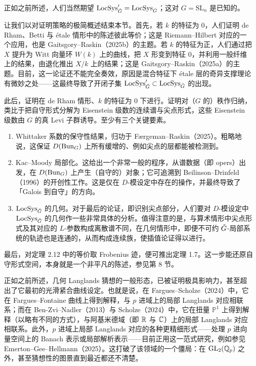 正如之前所述，人们当然期望 $\operatorname{LocSys}'_{\check{G}} = \operatorname{LocSys}_{\check{G}}$；这对 $G = \mathrm{SL}_n$ 是已知的。

让我们以对证明策略的极简概述结束本节。首先，若 $k$ 的特征为 $0$，人们证明 de Rham、Betti 与 étale 情形中的陈述彼此等价；这是 Riemann–Hilbert 对应的一个应用，也是 Gaitsgory–Raskin（2025b）的主题。若 $k$ 的特征为正，人们通过把 $X$ 提升为 Witt 向量环 $W(k)$ 上的曲线，把 $X$ 形变到特征 $0$，并利用一般纤维上的结果，由退化推出 $X/k$ 上的结果；这是 Gaitsgory–Raskin（2025a）的主题。目前，这一论证还不能完全奏效，原因是混合特征下 étale 层的奇异支撑理论有微妙之处——这最终导致了开闭子集 $\operatorname{LocSys}'_{\check{G}} \subset \operatorname{LocSys}_{\check{G}}$ 的出现。

此后，证明在 de Rham 情形、$k$ 的特征为 $0$ 下进行。证明对（$G$ 的）秩作归纳，类比于把自守形式分解为 Eisenstein 级数的连续谱与尖点形式，这些 Eisenstein 级数由 $G$ 的真 Levi 子群诱导。至少有三个关键要素。

\begin{enumerate}
\item Whittaker 系数的保守性结果，归功于 Færgeman–Raskin（2025）。粗略地说，这保证 $D(\operatorname{Bun}_G)$ 上所有缓增的、例如尖点的层都能被检测到。
\item Kac–Moody 局部化。这给出一个非常一般的程序，从谱数据（即 opers）出发，在 $D(\operatorname{Bun}_G)$ 上产生（自守的）对象；它可追溯到 Beilinson–Drinfeld（1996）的开创性工作。这是仅在 $D$-模设定中存在的操作，并最终导致了「Galois 到自守」的方向。
\item $\operatorname{LocSys}_{\check{G}}$ 的几何。对于最后的论证，即识别尖点部分，人们要对 $D$-模设定中 $\operatorname{LocSys}_{\check{G}}$ 的几何作一些非常具体的分析。值得注意的是，与算术情形中尖点形式及其对应的 $L$-参数构成离散谱不同，在几何情形中，即便不可约 $\check{G}$-局部系统的轨迹也是连通的，从而构成连续族，使插值论证得以进行。
\end{enumerate}

最后，对定理 2.12 中的等价取 Frobenius 迹，便可推出定理 1.7。这一步能还原自守形式空间，本身就是一个非平凡的陈述，参见第 8 节。

\begin{remark}
正如之前所述，几何 Langlands 猜想的一般形态，已被证明极具影响力，甚至超出了它最初的光滑紧合曲线设定。也就是说，在 Fargues–Scholze（2024）中，它在 Fargues–Fontaine 曲线上得到解释，与 $p$ 进域上的局部 Langlands 对应相联系；而在 Ben-Zvi–Nadler（2013）与 Scholze（2024）中，它在扭量 $\mathbb{P}^1$ 上得到解释（以略有不同的方式），与阿基米德域（即 $\mathbb{R}$ 与 $\mathbb{C}$）上的局部 Langlands 对应相联系。此外，$p$ 进域上局部 Langlands 对应的各种更精细形式——处理 $p$ 进向量空间上的 Banach 表示或局部解析表示——目前正用这一范式研究，例如参见 Emerton–Gee–Hellmann（2025）。这打破了该领域的一个僵局：在 $\mathrm{GL}_2(\mathbb{Q}_p)$ 之外，甚至猜想性的图景直到最近都还不清楚。
\end{remark}
